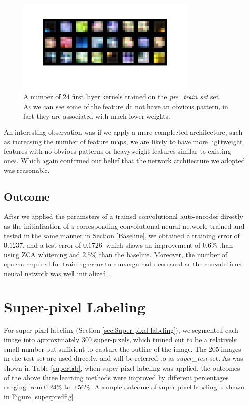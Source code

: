 \begin{figure}[h!]
  \centering  
  \includegraphics[width=0.8\textwidth]{pics/kernels.png}
  \caption{A number of 24 first layer kernels trained on the \textit{pre\_train set} set. As we can see some of the feature do not have an obvious pattern, in fact they are associated with much lower weights.}
  \label{kernelfig}
\end{figure}

An interesting observation was if we apply a more complected architecture, such as increasing the number of feature maps, we are likely to have more lightweight features with no obvious patterns or heavyweight features similar to existing ones. Which again confirmed our belief that the network architecture we adopted was reasonable.

\subsection{Outcome}
After we applied the parameters of a trained convolutional auto-encoder directly as the initialization of a corresponding convolutional neural network, trained and tested in the same manner in Section \ref{Baseline}, we obtained a training error of $0.1237$, and a test error of $0.1726$, which shows an improvement of $0.6\%$ than using ZCA whitening and $2.5\%$ than the baseline. Moreover, the number of epochs required for training error to converge had decreased as the convolutional neural network was well initialized .

\section{Super-pixel Labeling}

For super-pixel labeling (Section \ref{sec:Super-pixel labeling}), we segmented each image into approximately 300 super-pixels, which turned out to be a relatively small number but sufficient to capture the outline of the image. The 205 images in the test set are used directly, and will be referred to as \textit{super\_test} set. As was shown in Table \ref{supertab}, when super-pixel labeling was applied, the outcomes of the above three learning methods were improved by different percentages ranging from $0.24\%$ to $0.56\%$. A sample outcome of super-pixel labeling is shown in Figure \ref{superpredfig}.

